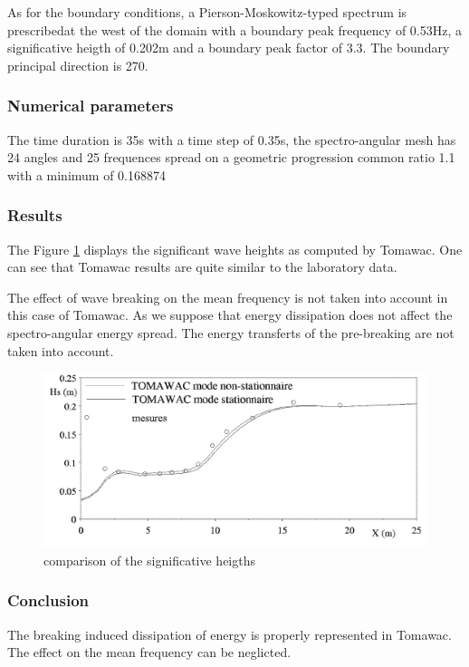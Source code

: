 As for the boundary conditions, a Pierson-Moskowitz-typed spectrum is prescribedat the west of the domain with a boundary peak frequency of 0.53Hz, a significative heigth of 0.202m and a boundary peak factor of 3.3. The boundary principal direction is 270.
%
%
\subsubsection{Numerical parameters}
%
The time duration is 35s with a time step of 0.35s, the spectro-angular mesh has 24 angles and 25 frequences spread on a geometric progression common ratio 1.1 with a minimum of 0.168874
%
%
\subsubsection{Results}
%
The Figure \ref{resultbj} displays the significant wave heights as computed by Tomawac. One can see that Tomawac results are quite similar to the laboratory data.

The effect of wave breaking on the mean frequency is not taken into account in this case of Tomawac. As we suppose that energy dissipation does not affect the spectro-angular energy spread. The energy transferts of the pre-breaking are not taken into account.
\begin{figure} [!h]
\centering
\includegraphics{results.png}
 \caption{comparison of the significative heigths}
\label{resultbj}
\end{figure}
\subsubsection{Conclusion}
The breaking induced dissipation of energy is properly represented in Tomawac. The effect on the mean frequency can be neglicted.




